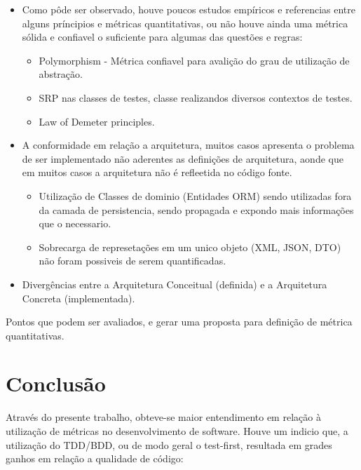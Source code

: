 \documentclass[12pt]{article}
\begin{document}
 \begin{itemize}
 	\item Como  pôde  ser  observado,  houve  poucos  estudos  empíricos e referencias entre alguns príncipios e métricas quantitativas, ou não houve ainda uma métrica sólida e confiavel o suficiente para algumas das questões e regras:
		\begin{itemize}
		 \item Polymorphism - Métrica confiavel para avalição do grau de utilização de abstração.
		 \item  SRP nas classes de testes, classe realizandos diversos contextos de testes.
		 \item Law of Demeter principles.
		\end{itemize}
	\item A conformidade em relação a arquitetura, muitos casos apresenta  o problema de ser implementado não aderentes as definições de arquitetura, aonde  que  em  muitos  casos  a  arquitetura  não  é  refleetida  no  código  fonte.
		\begin{itemize}
		 \item Utilização de Classes de dominio (Entidades ORM) sendo utilizadas fora da camada de persistencia, sendo propagada e expondo mais informações que o necessario.
		 \item Sobrecarga de represetações em um unico objeto (XML, JSON, DTO) não foram possiveis de serem quantificadas.
		\end{itemize}
	\item Divergências  entre  a  Arquitetura  Conceitual  (definida) e a Arquitetura  Concreta  (implementada).
\end{itemize}

Pontos que podem ser avaliados, e gerar uma proposta para definição de métrica quantitativas. 

\part{Conclusão} \label{sec:conclusao}

Através do presente trabalho, obteve-se maior entendimento em relação à utilização de métricas no desenvolvimento de software.
Houve um indicio que, a utilização do TDD/BDD, ou de modo geral o test-first, resultada em grades ganhos em relação a qualidade de código:
\end{document}

